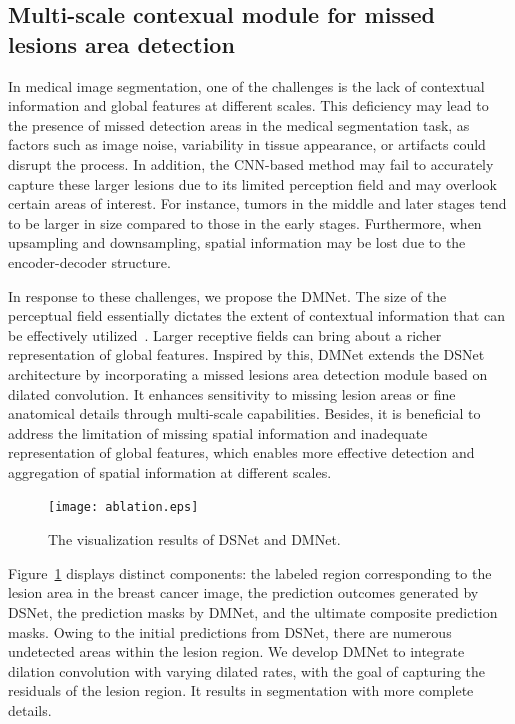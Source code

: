 \documentclass[review]{elsarticle}
\begin{document}
	\subsection{Multi-scale contexual module for missed lesions area detection}
	In medical image segmentation, one of the challenges is the lack of contextual information and global features at different scales. This deficiency may lead to the presence of missed detection areas in the medical segmentation task, as factors such as image noise, variability in tissue appearance, or artifacts could disrupt the process. In addition, the CNN-based method may fail to accurately capture these larger lesions due to its limited perception field and may overlook certain areas of interest. For instance, tumors in the middle and later stages tend to be larger in size compared to those in the early stages. Furthermore, when upsampling and downsampling, spatial information may be lost due to the encoder-decoder structure.
	
	In response to these challenges, we propose the DMNet. The size of the perceptual field essentially dictates the extent of contextual information that can be effectively utilized~\cite{wang2022medical}. Larger receptive fields can bring about a richer representation of global features. Inspired by this, DMNet extends the DSNet architecture by incorporating a missed lesions area detection module based on dilated convolution. It enhances sensitivity to missing lesion areas or fine anatomical details through multi-scale capabilities. Besides, it is beneficial to address the limitation of missing spatial information and inadequate representation of global features, which enables more effective detection and aggregation of spatial information at different scales.
	
	\begin{figure}[t]
	\centering
	\begin{adjustwidth}{2.1cm}{}
		\texttt{[image: ablation.eps]}
	\end{adjustwidth}
	\caption{The visualization results of DSNet and DMNet.}
	\label{fig:dilated}
	\end{figure}

	Figure~\ref{fig:dilated} displays distinct components: the labeled region corresponding to the lesion area in the breast cancer image, the prediction outcomes generated by DSNet, the prediction masks by DMNet, and the ultimate composite prediction masks. Owing to the initial predictions from DSNet, there are numerous undetected areas within the lesion region. We develop DMNet to integrate dilation convolution with varying dilated rates, with the goal of capturing the residuals of the lesion region. It results in segmentation with more complete details.
	
\end{document}
